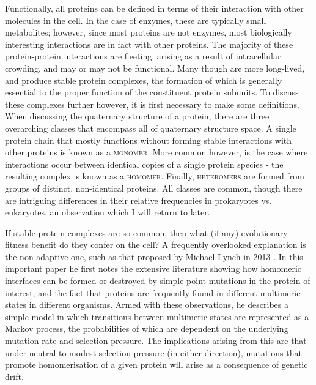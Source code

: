 \documentclass[a4paper,11pt,twoside,openright]{scrbook}
\let\cite\supercite
\begin{document}
Functionally, all proteins can be defined in terms of their interaction with other molecules in the cell. In the case of enzymes, these are typically small metabolites; however, since most proteins are not enzymes, most biologically interesting interactions are in fact with other proteins. The majority of these protein-protein interactions are fleeting, arising as a result of intracellular crowding, and may or may not be functional. Many though are more long-lived, and produce stable protein complexes, the formation of which is generally essential to the proper function of the constituent protein subunits. To discuss these complexes further however, it is first necessary to make some definitions. When discussing the quaternary structure of a protein, there are three overarching classes that encompass all of quaternary structure space. A single protein chain that mostly functions without forming stable interactions with other proteins is known as a \textsc{monomer}. More common however, is the case where interactions occur between identical copies of a single protein species - the resulting complex is known as a \textsc{homomer}. Finally, \textsc{heteromers} are formed from groups of distinct, non-identical proteins. All classes are common, though there are intriguing differences in their relative frequencies in prokaryotes vs. eukaryotes, an observation which I will return to later.

If stable protein complexes are so common, then what (if any) evolutionary fitness benefit do they confer on the cell? A frequently overlooked explanation is the non-adaptive one, such as that proposed by Michael Lynch in 2013 \cite{Lynch2013}. In this important paper he first notes the extensive literature showing how homomeric interfaces can be formed or destroyed by simple point mutations in the protein of interest, and the fact that proteins are frequently found in different multimeric states in different organisms. Armed with these observations, he describes a simple model in which transitions between multimeric states are represented as a Markov process, the probabilities of which are dependent on the underlying mutation rate and selection pressure. The implications arising from this are that under neutral to modest selection pressure (in either direction), mutations that promote homomerisation of a given protein will arise as a consequence of genetic drift.
\end{document}
